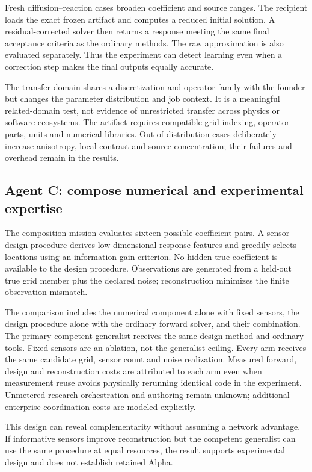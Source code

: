 \documentclass[11pt,letterpaper]{article}
\begin{document}
Fresh diffusion--reaction cases broaden coefficient and source ranges. The recipient loads the exact frozen artifact and computes a reduced initial solution. A residual-corrected solver then returns a response meeting the same final acceptance criteria as the ordinary methods. The raw approximation is also evaluated separately. Thus the experiment can detect learning even when a correction step makes the final outputs equally accurate.

The transfer domain shares a discretization and operator family with the founder but changes the parameter distribution and job context. It is a meaningful related-domain test, not evidence of unrestricted transfer across physics or software ecosystems. The artifact requires compatible grid indexing, operator parts, units and numerical libraries. Out-of-distribution cases deliberately increase anisotropy, local contrast and source concentration; their failures and overhead remain in the results.

\subsection{Agent C: compose numerical and experimental expertise}

The composition mission evaluates sixteen possible coefficient pairs. A sensor-design procedure derives low-dimensional response features and greedily selects locations using an information-gain criterion. No hidden true coefficient is available to the design procedure. Observations are generated from a held-out true grid member plus the declared noise; reconstruction minimizes the finite observation mismatch.

The comparison includes the numerical component alone with fixed sensors, the design procedure alone with the ordinary forward solver, and their combination. The primary competent generalist receives the same design method and ordinary tools. Fixed sensors are an ablation, not the generalist ceiling. Every arm receives the same candidate grid, sensor count and noise realization. Measured forward, design and reconstruction costs are attributed to each arm even when measurement reuse avoids physically rerunning identical code in the experiment. Unmetered research orchestration and authoring remain unknown; additional enterprise coordination costs are modeled explicitly.

This design can reveal complementarity without assuming a network advantage. If informative sensors improve reconstruction but the competent generalist can use the same procedure at equal resources, the result supports experimental design and does not establish retained Alpha.
\end{document}
